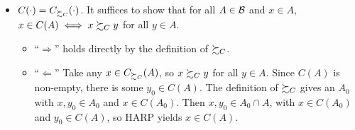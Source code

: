 {\begin{itemize}
\begin{itemize}
      \begin{itemize}
      \item
        \(x\in C(\{x,y,z\})\). Since \(z\in\{x,y,z\}\), the definition
        of \(\pref_C\) gives \(x\pref_C z\) directly.
      \item
        \(y\in C(\{x,y,z\})\). From \(x\pref_C y\) there exists \(A_0\)
        with \(y\in A_0\) and \(x\in C(A_0)\). Apply HARP with this
        \(A_0\) and \(B=\{x,y,z\}\) (both contain \(x\) and \(y\)) to
        get \(x\in C(\{x,y,z\})\). This reduces to case 1, so
        \(x\pref_C z\).
      \item
        \(z\in C(\{x,y,z\})\). From \(y\pref_C z\) there exists \(A_0\)
        with \(z\in A_0\) and \(y\in C(A_0)\). HARP gives
        \(y\in C(\{x,y,z\})\), reducing to case 2, and hence
        \(x\pref_C z\).
      \end{itemize}
  \item
    \textit{\(C(\cdot) = C_{\succsim_C}(\cdot)\).} It suffices to show that
    for all \(A\in\mathcal B\) and \(x\in A\),
    \(x\in C(A) \iff x\succsim_C y\) for all \(y\in A\).

      \begin{itemize}
      \item
        ``\(\Rightarrow\)'' holds directly by the definition of
        \(\pref_C\).
      \item
        ``\(\Leftarrow\)'' Take any \(x\in C_{\succsim_C}(A)\), so
        \(x\pref_C y\) for all \(y\in A\). Since \(C(A)\) is non-empty,
        there is some \(y_0\in C(A)\). The definition of \(\pref_C\)
        gives an \(A_0\) with \(x,y_0\in A_0\) and \(x\in C(A_0)\).
        Then \(x,y_0\in A_0\cap A\), with \(x\in C(A_0)\) and
        \(y_0\in C(A)\), so HARP yields \(x\in C(A)\).
      \end{itemize}
    \end{itemize}
  \end{itemize}
}



